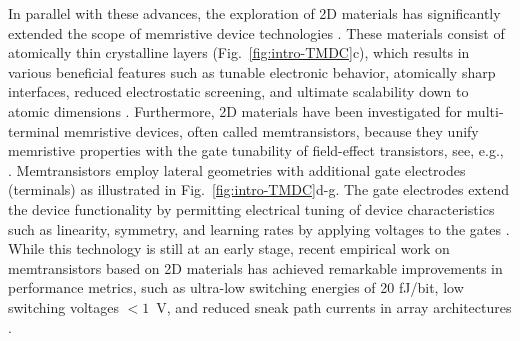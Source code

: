 \documentclass[10pt,a4paper, final]{article}
\theoremstyle{definition}								%
\numberwithin{equation}{section}
\numberwithin{figure}{section}
\numberwithin{theorem}{section}
\begin{document}
In parallel with these advances, the exploration of 2D materials has significantly extended the scope of memristive device technologies \cite{Song.2023, Berggren.2021}.
These materials consist of atomically thin crystalline layers (Fig.~\ref{fig:intro-TMDC}c), which results in various beneficial features such as tunable electronic behavior, atomically sharp interfaces, reduced electrostatic screening, and ultimate scalability down to atomic dimensions \cite{Berggren.2021, Yao.2019, Han.2011}.
Furthermore, 2D materials have been investigated for multi-terminal memristive devices, often called memtransistors, because they unify memristive properties with the gate tunability of field-effect transistors, see, e.g., \cite{Sangwan.2018c, Feng.2021, Leng.2023, Ding.2021, Wali.2023}.
Memtransistors employ lateral geometries with additional gate electrodes (terminals) as illustrated in Fig.~\ref{fig:intro-TMDC}d-g.
The gate electrodes extend the device functionality by permitting electrical tuning of device characteristics such as linearity, symmetry, and learning rates by applying voltages to the gates \cite{Sangwan.2018c, Ding.2021, Lee.2020b, Yan.2022, Rodder.2020}.
While this technology is still at an early stage, recent empirical work on memtransistors based on 2D materials has achieved remarkable improvements in performance metrics, such as ultra-low switching energies of 20 fJ/bit, low switching voltages $<1$~V, and reduced sneak path currents in array architectures \cite{Feng.2021, Lee.2020b, Rahimifard.2022, Liu.2024}.
\end{document}
